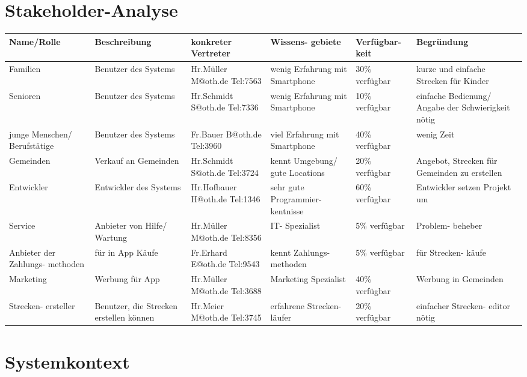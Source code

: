\documentclass[a4paper, 12pp]{article}
\begin{document}
\section{Stakeholder-Analyse}

\begin{center}


\begin{tabular}{|p{2cm}|p{2cm}|p{2cm}|p{2cm}|p{2cm}|p{2cm}|}
\hline
Name/Rolle & Beschreibung & konkreter Vertreter & Wissens- gebiete & Verfügbar- keit & Begründung\\ \hline
Familien & Benutzer des Systems & Hr.Müller M@oth.de Tel:7563& wenig Erfahrung mit Smartphone & 30\% verfügbar & kurze und einfache Strecken für Kinder\\ \hline
Senioren & Benutzer des Systems & Hr.Schmidt S@oth.de Tel:7336 & wenig Erfahrung mit Smartphone & 10\% verfügbar & einfache Bedienung/ Angabe der Schwierigkeit nötig\\ \hline
junge Menschen/ Berufstätige & Benutzer des Systems & Fr.Bauer B@oth.de Tel:3960& viel Erfahrung mit Smartphone & 40\% verfügbar & wenig Zeit\\ \hline
Gemeinden & Verkauf an Gemeinden & Hr.Schmidt S@oth.de Tel:3724& kennt Umgebung/ gute Locations & 20\% verfügbar & Angebot, Strecken für Gemeinden zu erstellen\\ \hline
Entwickler & Entwickler des Systems & Hr.Hofbauer H@oth.de Tel:1346& sehr gute Programmier- kentnisse & 60\% verfügbar & Entwickler setzen Projekt um\\ \hline
Service & Anbieter von Hilfe/ Wartung & Hr.Müller M@oth.de Tel:8356& IT- Spezialist & 5\% verfügbar & Problem- beheber\\ \hline
Anbieter der Zahlungs- methoden & für in App Käufe & Fr.Erhard E@oth.de Tel:9543 & kennt Zahlungs- methoden & 5\% verfügbar & für Strecken- käufe\\ \hline
Marketing & Werbung für App & Hr.Müller M@oth.de Tel:3688 & Marketing Spezialist & 40\% verfügbar & Werbung in Gemeinden\\ \hline
Strecken- ersteller & Benutzer, die Strecken erstellen können & Hr.Meier M@oth.de Tel:3745& erfahrene Strecken- läufer & 20\% verfügbar & einfacher Strecken- editor nötig\\ \hline
\hline

\end{tabular}
\end{center}

\section{Systemkontext}
\end{document}
